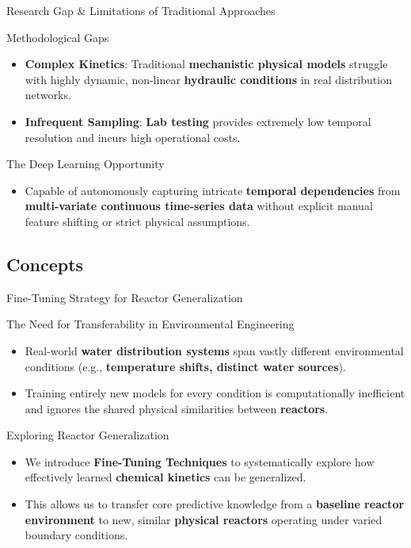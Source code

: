 \documentclass[xcolor=dvipsnames]{beamer}
\begin{document}
\begin{frame}{Research Gap \& Limitations of Traditional Approaches}
  \begin{block}{Methodological Gaps}
    \begin{itemize}
        \item \textbf{Complex Kinetics}: Traditional \textbf{mechanistic physical models} struggle with highly dynamic, non-linear \textbf{hydraulic conditions} in real distribution networks.
        \item \textbf{Infrequent Sampling}: \textbf{Lab testing} provides extremely low temporal resolution and incurs high operational costs.
    \end{itemize}
  \end{block}
  \begin{block}{The Deep Learning Opportunity}
    \begin{itemize}
        \item Capable of autonomously capturing intricate \textbf{temporal dependencies} from \textbf{multi-variate continuous time-series data} without explicit manual feature shifting or strict physical assumptions.
    \end{itemize}
  \end{block}
\end{frame}

\subsection{Concepts}
\begin{frame}{Fine-Tuning Strategy for Reactor Generalization}
  \small
  \begin{block}{The Need for Transferability in Environmental Engineering}
      \begin{itemize}
          \item Real-world \textbf{water distribution systems} span vastly different environmental conditions (e.g., \textbf{temperature shifts, distinct water sources}).
          \item Training entirely new models for every condition is computationally inefficient and ignores the shared physical similarities between \textbf{reactors}.
      \end{itemize}
  \end{block}
  \begin{block}{Exploring Reactor Generalization}
      \begin{itemize}
          \item We introduce \textbf{Fine-Tuning Techniques} to systematically explore how effectively learned \textbf{chemical kinetics} can be generalized.
          \item This allows us to transfer core predictive knowledge from a \textbf{baseline reactor environment} to new, similar \textbf{physical reactors} operating under varied boundary conditions.
      \end{itemize}
  \end{block}
\end{frame}
\end{document}
